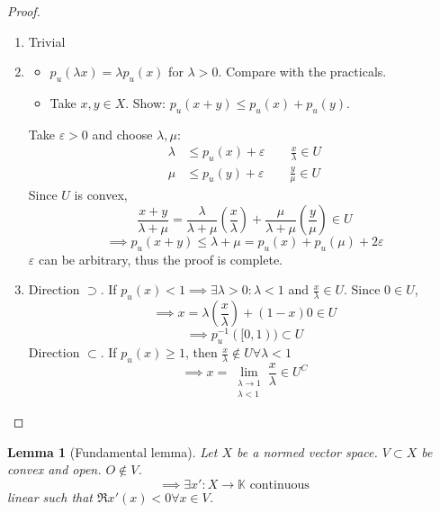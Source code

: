 \documentclass[a4paper]{article}
\numberwithin{lecref}{section}
\newtheorem*{Lemma}{Lemma}
\begin{document}
\begin{proof}
	\begin{enumerate}
		\item Trivial
		\item
			\begin{itemize}
				\item $p_u(\lambda x) = \lambda p_u(x)$ for $\lambda > 0$. Compare with the practicals.
				\item Take $x, y \in X$. Show: $p_u(x + y) \leq p_u(x) + p_u(y)$.
			\end{itemize}
			Take $\varepsilon > 0$ and choose $\lambda, \mu$:
			\begin{align*}
				\lambda &\leq p_u(x) + \varepsilon  \qquad \frac x\lambda \in U \\
				\mu &\leq p_u(y) + \varepsilon  \qquad \frac y\mu \in U
			\end{align*}
			Since $U$ is convex,
			\[ \frac{x + y}{\lambda + \mu} = \frac\lambda{\lambda + \mu} \left(\frac x\lambda\right) + \frac\mu{\lambda + \mu} \left(\frac y\mu\right) \in U \]
			\[ \implies p_u(x + y) \leq \lambda + \mu = p_u(x) + p_u(\mu) + 2\varepsilon \]
			$\varepsilon$ can be arbitrary, thus the proof is complete.
		\item Direction $\supset$. If $p_u(x) < 1 \implies \exists \lambda > 0: \lambda < 1$ and $\frac x\lambda \in U$. Since $0 \in U$,
			\[ \implies x = \lambda \left(\frac x\lambda\right) + (1 - x) 0 \in U \]
			\[ \implies p_u^{-1}([0, 1)) \subset U \]
			Direction $\subset$. If $p_u(x) \geq 1$, then $\frac x\lambda \not\in U \forall \lambda < 1$
			\[ \implies x = \lim_{\substack{\lambda \to 1 \\ \lambda < 1}} \frac{x}{\lambda} \in U^C \]
	\end{enumerate}
\end{proof}

\begin{Lemma}[Fundamental lemma]
	\label{lemma:4.10}
	Let $X$ be a normed vector space. $V \subset X$ be convex and open. $O \not\in V$.
	\[ \implies \exists x': X \to \mathbb K \text{ continuous} \]
	linear such that $\Re{x'(x)} < 0 \forall x \in V$.
\end{Lemma}
\end{document}
